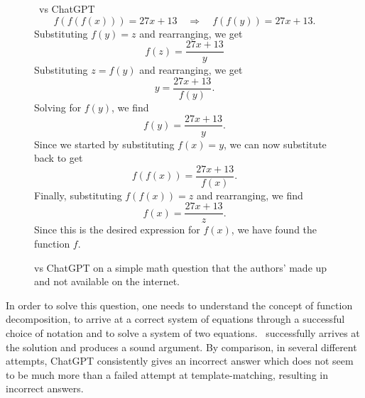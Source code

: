 \begin{figure}[H]
\begin{AIbox}{\DV~vs ChatGPT}
{\[f(f(f(x))) = 27x + 13 \quad \Rightarrow \quad f(f(y)) = 27x + 13.\]
Substituting $f(y) = z$ and rearranging, we get
\[f(z) = \frac{27x + 13}{y}\]
Substituting $z = f(y)$ and rearranging, we get
\[y = \frac{27x + 13}{f(y)}.\]
Solving for $f(y)$, we find
\[f(y) = \frac{27x + 13}{y}.\]
Since we started by substituting $f(x) = y$, we can now substitute back to get
\[f(f(x)) = \frac{27x + 13}{f(x)}.\]
Finally, substituting $f(f(x)) = z$ and rearranging, we find
\[f(x) = \frac{27x + 13}{z}.\]
Since this is the desired expression for $f(x)$, we have found the function $f$.
}
\end{AIbox}
\caption{\DV vs ChatGPT on a simple math question that the authors' made up and not available on the internet.}
\label{fig:code-memory-align}
\end{figure}


In order to solve this question, one needs to understand the concept of function decomposition, to arrive at a correct system of equations through a successful choice of notation and to solve a system of two equations. \DV \ successfully arrives at the solution and produces a sound argument. By comparison, in several different attempts, ChatGPT consistently gives an incorrect answer which does not seem to be much more than a failed attempt at template-matching, resulting in incorrect answers.


